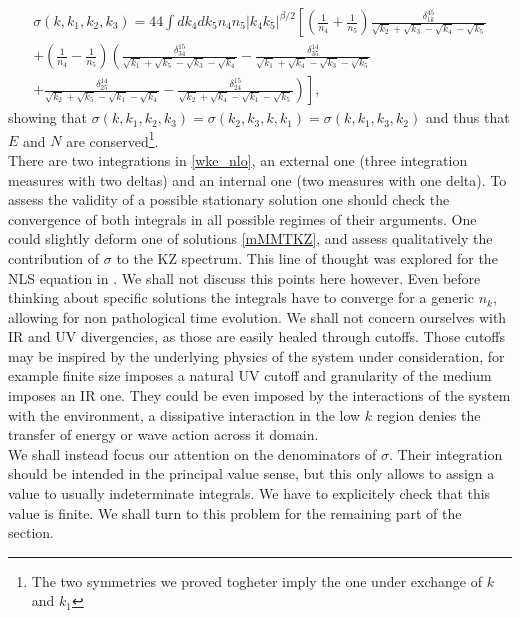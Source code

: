     \begin{multline*}
      \sigma(k,k_1,k_2,k_3) =  44 \int dk_4dk_5n_4n_5|k_4k_5|^{\beta/2} 
       \left[\left( \frac{1}{n_4}+\frac{1}{n_5} \right) 
      \frac{\delta_{1k}^{45}}{\sqrt{k_2}+\sqrt{k_3}-\sqrt{k_4}-\sqrt{k_5}} \right. \\
      + \left( \frac{1}{n_4}-\frac{1}{n_5} \right) 
      \left(\frac{\delta_{34}^{15}}{\sqrt{k_1}+\sqrt{k_5}-\sqrt{k_3}-\sqrt{k_4}} - \frac{\delta_{35}^{14}}{\sqrt{k_1} +\sqrt{k_4}-\sqrt{k_3}-\sqrt{k_5}}  \right. \\
      \left. \left. +\frac{\delta_{25}^{14}}{\sqrt{k_2}+\sqrt{k_5}-\sqrt{k_1}-\sqrt{k_4}} -\frac{\delta_{24}^{15}}{\sqrt{k_2}+\sqrt{k_4}-\sqrt{k_1}-\sqrt{k_5}}\right)\right],
    \end{multline*}
    showing that $\sigma(k,k_1,k_2,k_3) = \sigma(k_2,k_3,k,k_1) = \sigma(k,k_1,k_3,k_2)$ and thus that $E$ and $N$ are conserved\footnote{
        The two symmetries we proved togheter imply the one under exchange of $k$ and $k_1$}.\\ 
    There are two integrations in \eqref{wke_nlo}, an external one (three integration measures with two deltas) and an internal one (two measures with one delta). 
    To assess the validity of a possible stationary solution one should check the convergence of both integrals in all possible regimes of their arguments. One could
    slightly deform one of solutions \eqref{mMMTKZ}, and assess qualitatively the contribution of $\sigma$ to the KZ spectrum. This line of thought 
    was explored for the NLS equation in \cite{Rosenhaus:2025mgj}. We shall not discuss this points here however. Even before thinking about specific solutions 
    the integrals have to converge for a generic $n_k$, allowing for non pathological time evolution. We shall not concern ourselves with IR and UV divergencies,
    as those are easily healed through cutoffs. Those cutoffs may be inspired by the underlying physics of the system under consideration, for example 
    finite size imposes a natural UV cutoff and granularity of the medium imposes an IR one. They could be even imposed by the interactions of the system with 
    the environment, a dissipative interaction in the low $k$ region denies the transfer of energy or wave action across it domain. \\
    We shall instead focus our attention on the denominators of $\sigma$. Their integration should be intended in the principal value sense, but this only allows to 
    assign a value to usually indeterminate integrals. We have to explicitely check that this value is finite. We shall turn to this problem for the remaining part 
    of the section.\\

